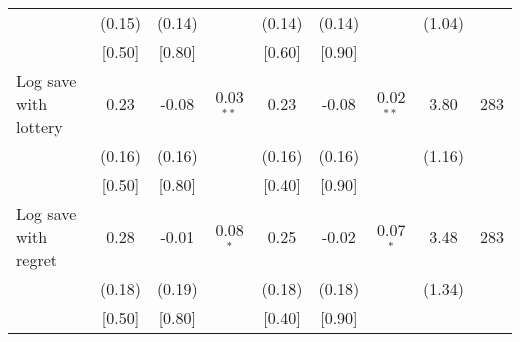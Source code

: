 \begin{table}[htbp]
{\begin{threeparttable}
\begin{tabular}{l*{8}{c}}
          &   (0.15)&   (0.14)&         &   (0.14)&   (0.14)&         &   (1.04)&         \\
          &   [0.50]&   [0.80]&         &   [0.60]&   [0.90]&         &         &         \\
Log save with lottery&     0.23&    -0.08&0.03$^{**}$&     0.23&    -0.08&0.02$^{**}$&     3.80&      283\\
          &   (0.16)&   (0.16)&         &   (0.16)&   (0.16)&         &   (1.16)&         \\
          &   [0.50]&   [0.80]&         &   [0.40]&   [0.90]&         &         &         \\
Log save with regret&     0.28&    -0.01&0.08$^{*}$&     0.25&    -0.02&0.07$^{*}$&     3.48&      283\\
          &   (0.18)&   (0.19)&         &   (0.18)&   (0.18)&         &   (1.34)&         \\
          &   [0.50]&   [0.80]&         &   [0.40]&   [0.90]&         &         &         \\
\bottomrule \end{tabular} \begin{tablenotes}[flushleft] \footnotesize \item  \end{tablenotes} \end{threeparttable} } \end{table}
